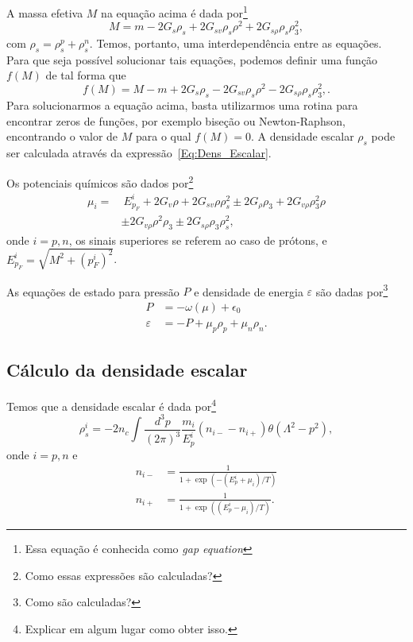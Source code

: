 A massa efetiva $M$ na equação acima é dada por\footnote{Essa equação é conhecida como \emph{gap equation}}
\begin{equation}\label{Eq:Gap}
	M = m - 2G_s\rho_s + 2G_{sv}\rho_s\rho^2 + 2 G_{s\rho}\rho_s\rho_3^2,
\end{equation}
%
com $\rho_s = \rho_s^p + \rho_s^n$. Temos, portanto, uma interdependência entre as equações. Para que seja possível solucionar tais equações, podemos definir uma função $f(M)$ de tal forma que
\begin{equation}\label{Eq:Gap_zero}
	f(M) = M - m + 2G_s\rho_s - 2G_{sv}\rho_s\rho^2 - 2 G_{s\rho}\rho_s\rho_3^2,.
\end{equation}
%
Para solucionarmos a equação acima, basta utilizarmos uma rotina para encontrar zeros de funções, por exemplo biseção ou Newton-Raphson, encontrando o valor de $M$ para o qual $f(M) = 0$. A densidade escalar $\rho_s$ pode ser calculada através da expressão~\eqref{Eq:Dens_Escalar}.

Os potenciais químicos são dados por\footnote{Como essas expressões são calculadas?}
\begin{equation}\label{Eq:Potenciais_Quimicos}
\begin{split}
	\mu_i =&~ E_{p_F}^i + 2G_v\rho + 2G_{sv}\rho\rho_s^2 \pm 2G_\rho\rho_3+2G_{v\rho}\rho_3^2\rho \\
	& \pm 2G_{v\rho}\rho^2\rho_3 \pm 2 G_{s\rho}\rho_3\rho_s^2,
\end{split}
\end{equation}
%
onde $i = p,n$, os sinais superiores se referem ao caso de prótons, e $E_{p_F}^i = \sqrt{M^2 + (p_F^i)^2}$.

As equações de estado para pressão $P$ e densidade de energia $\varepsilon$ são dadas por\footnote{Como são calculadas?}
\begin{align}
	P &= -\omega(\mu) + \epsilon_0 \label{Eq:Pressao}\\
	\varepsilon &= -P + \mu_p\rho_p + \mu_n\rho_n. \label{Eq:Densidade_energia}
\end{align}

\subsection{Cálculo da densidade escalar}

Temos que a densidade escalar é dada por\footnote{Explicar em algum lugar como obter isso.}
\begin{equation}
	\rho_s^i = - 2 n_c \int \frac{d^3p}{(2\pi)^3}\frac{m_i}{E_p^i}(n_{i-} - n_{i+}) \theta(\Lambda^2 - p^2),
\end{equation}
%
onde $i = p, n$ e
\begin{align}
	n_{i-} &= \frac{1}{1 + \exp(-(E_p^i+\mu_i)/T)} \\
	n_{i+} &= \frac{1}{1 + \exp((E_p^i-\mu_i)/T)}.
\end{align}

